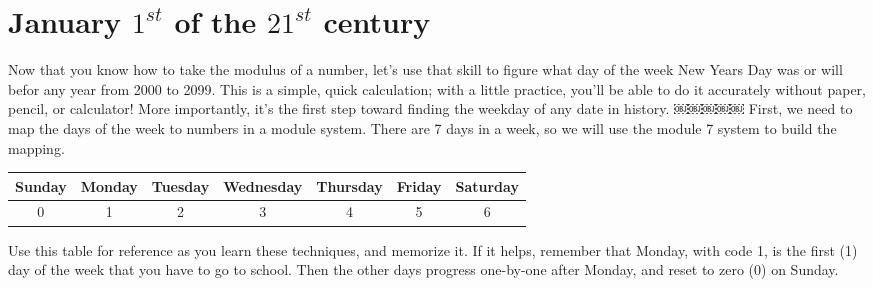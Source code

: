 \documentclass{article}
\begin{document}
  \section{January $1^{st}$ of the $21^{st}$ century}
    Now that you know how to take the modulus of a number, 
    let's use that skill to figure what day of the week New Years Day was\textemdash
    or will be\textemdash for any year from 2000 to 2099. 
    This is a simple, quick calculation; with a little practice, 
    you'll be able to do it accurately without paper, pencil, or calculator! 
    More importantly, it's the first step toward finding the weekday of any date in history.
  ￼￼￼￼￼
    First, we need to map the days of the week to numbers in a module system. 
    There are 7 days in a week, so we will use the module 7 system to build the mapping.\\

    \begin{center}
      \begin{tabular}{|c | c | c | c | c | c | c|}\hline
        Sunday & Monday & Tuesday & Wednesday & Thursday & Friday &  Saturday \\\hline
        0 & 1 & 2 & 3 & 4 & 5 & 6  \\\hline
      \end{tabular}
    \end{center}

    Use this table for reference as you learn these techniques, and memorize it. 
    If it helps, remember that Monday, with code 1, is the first (1) day of the 
    week that you have to go to school. Then the other days progress one-by-one 
    after Monday, and reset to zero (0) on Sunday.\\\\
\end{document}
